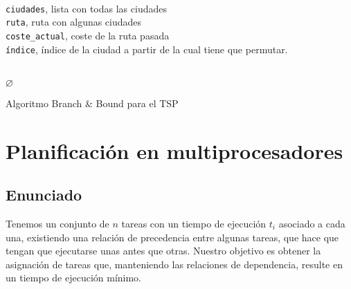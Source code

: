 \documentclass[a4paper, 11pt]{article} %
\let\emptyset\varnothing
\begin{document}
    \begin{algorithm}[H]
    	\begin{algorithmic}[1]
		\REQUIRE \ \\
          \texttt{ciudades}, lista con todas las ciudades \\
          \texttt{ruta}, ruta con algunas ciudades \\
          \texttt{coste\_actual}, coste de la ruta pasada \\
          \texttt{índice}, índice de la ciudad a partir de la cual tiene que permutar. \\\



	      \ENDIF
	      \RETURN $\emptyset$
	    \ELSE
	        
	        
	      \ENDFOR
	    \ENDIF
    	\end{algorithmic}
        \caption{Algoritmo Branch \& Bound para el TSP}
        \label{BBound-TSP}
    \end{algorithm}

\section{Planificación en multiprocesadores}
  \subsection{Enunciado}
  Tenemos un conjunto de $n$ tareas con un tiempo de ejecución $t_i$ asociado a cada una, existiendo una relación de precedencia
  entre algunas tareas, que hace que tengan que ejecutarse unas antes que otras. Nuestro objetivo es obtener la asignación de tareas que, manteniendo las relaciones de dependencia, resulte en un tiempo de ejecución mínimo. 
  
\end{document}

